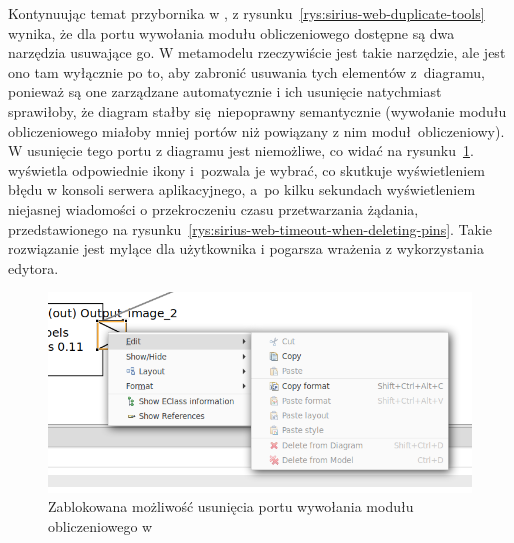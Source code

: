 Kontynuując temat przybornika w \SiriusWeb{}, z
rysunku~\ref{rys:sirius-web-duplicate-tools} wynika, że dla portu wywołania
modułu obliczeniowego dostępne są dwa narzędzia usuwające go. W
metamodelu rzeczywiście jest takie narzędzie, ale jest ono tam wyłącznie po to,
aby zabronić usuwania tych elementów z~diagramu, ponieważ są one zarządzane
automatycznie i ich usunięcie natychmiast sprawiłoby, że diagram stałby
się niepoprawny semantycznie (wywołanie modułu obliczeniowego miałoby mniej
portów niż powiązany z nim moduł obliczeniowy). W \SiriusDesktop{}
usunięcie tego portu z diagramu jest niemożliwe, co widać na
rysunku~\ref{rys:sirius-desktop-blocked-deleting-pins}.
\SiriusWeb{} wyświetla odpowiednie ikony i~pozwala je wybrać, co skutkuje
wyświetleniem błędu w konsoli serwera aplikacyjnego, a~po kilku sekundach
wyświetleniem niejasnej wiadomości o przekroczeniu czasu przetwarzania żądania,
przedstawionego na rysunku~\ref{rys:sirius-web-timeout-when-deleting-pins}.
Takie rozwiązanie jest mylące dla użytkownika i pogarsza wrażenia z
wykorzystania edytora.

\begin{figure}[!ht]
  \centering

  \includegraphics[width=0.95\linewidth]{./images/sirius-desktop-blocked-deleting-pins.png}
  \caption{Zablokowana możliwość usunięcia portu wywołania modułu
    obliczeniowego w \SiriusDesktop{}}\label{rys:sirius-desktop-blocked-deleting-pins}
\end{figure}

